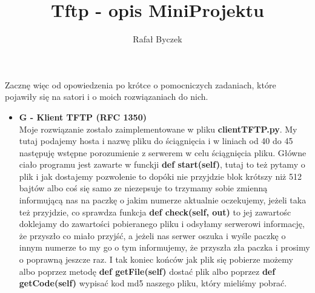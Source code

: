 \documentclass[11pt,a4paper]{article}
\author{Rafał Byczek}
\title{Tftp - opis MiniProjektu}
\begin{document}
\maketitle
Zacznę więc od opowiedzenia po krótce o pomocniczych zadaniach, które pojawiły się na satori i o moich rozwiązaniach do nich.
\begin{itemize}
\item \textbf{G - Klient TFTP (RFC 1350)}
\\
Moje rozwiązanie zostało zaimplementowane w pliku \textbf{clientTFTP.py}. My tutaj podajemy hosta i nazwę pliku  do ściągnięcia i w liniach od 40 do 45 następuję wstępne porozumienie z serwerem w celu ściągnięcia pliku. Główne ciało programu jest zawarte w funckji \textbf{def start(self)}, tutaj to też pytamy o plik i jak dostajemy pozwolenie to dopóki nie przyjdzie blok krótszy niż 512 bajtów albo coś się samo ze niezepsuje to trzymamy sobie zmienną informującą nas na paczkę o jakim numerze aktualnie oczekujemy, jeżeli taka też przyjdzie, co sprawdza funkcja \textbf{def check(self, out)} to jej zawartośc doklejamy do zawartości pobieranego pliku i odsyłamy serwerowi informację, że przyszło co miało przyjść, a jeżeli nas serwer oszuka i wyśle paczkę o innym numerze to my go o tym informujemy, że przyszła zła paczka i prosimy o poprawną jeszcze raz. I tak koniec końców jak plik się pobierze możemy albo poprzez metodę \textbf{def getFile(self)} dostać plik albo poprzez \textbf{def getCode(self)} wypisać kod md5 naszego pliku, który mieliśmy pobrać.
\end{itemize}
\end{document}
